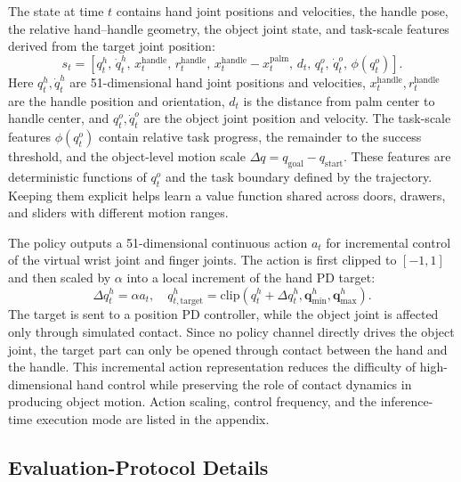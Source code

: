 \documentclass{llmxive}
\begin{document}
The state at time $t$ contains hand joint positions and velocities,
the handle pose, the relative hand--handle geometry, the object
joint state, and task-scale features derived from the target joint
position:
\begin{equation}
s_t = \left[
q_t^h,\,\dot q_t^h,\,
x_t^{\mathrm{handle}},\,r_t^{\mathrm{handle}},\,
x_t^{\mathrm{handle}}-x_t^{\mathrm{palm}},\,
d_t,\,
q_t^o,\,\dot q_t^o,\,
\phi(q_t^o)
\right].
\label{eq:state}
\end{equation}
Here $q_t^h,\dot q_t^h$ are 51-dimensional hand joint positions and
velocities, $x_t^{\mathrm{handle}},r_t^{\mathrm{handle}}$ are the
handle position and orientation, $d_t$ is the distance from palm
center to handle center, and $q_t^o,\dot q_t^o$ are the object joint
position and velocity. The task-scale features $\phi(q_t^o)$ contain
relative task progress, the remainder to the success threshold, and
the object-level motion scale $\Delta q =
q_{\mathrm{goal}}-q_{\mathrm{start}}$. These features are
deterministic functions of $q_t^o$ and the task boundary defined by
the trajectory. Keeping them explicit helps learn a value function
shared across doors, drawers, and sliders with different motion
ranges.

The policy outputs a 51-dimensional continuous action $a_t$ for
incremental control of the virtual wrist joint and finger joints.
The action is first clipped to $[-1,1]$ and then scaled by $\alpha$
into a local increment of the hand PD target:
\begin{equation}
\Delta q_t^h = \alpha a_t,\quad
q_{t,\mathrm{target}}^h =
\mathrm{clip}(q_t^h+\Delta q_t^h,
\mathbf{q}_{\min}^h,\mathbf{q}_{\max}^h).
\label{eq:action}
\end{equation}
The target is sent to a position PD controller, while the object
joint is affected only through simulated contact. Since no policy
channel directly drives the object joint, the target part can only be
opened through contact between the hand and the handle. This incremental
action representation reduces the difficulty of high-dimensional
hand control while preserving the role of contact dynamics in
producing object motion. Action scaling, control frequency, and the
inference-time execution mode are listed in the appendix.


\subsection{Evaluation-Protocol Details}
\label{sec:protocol}
\end{document}
